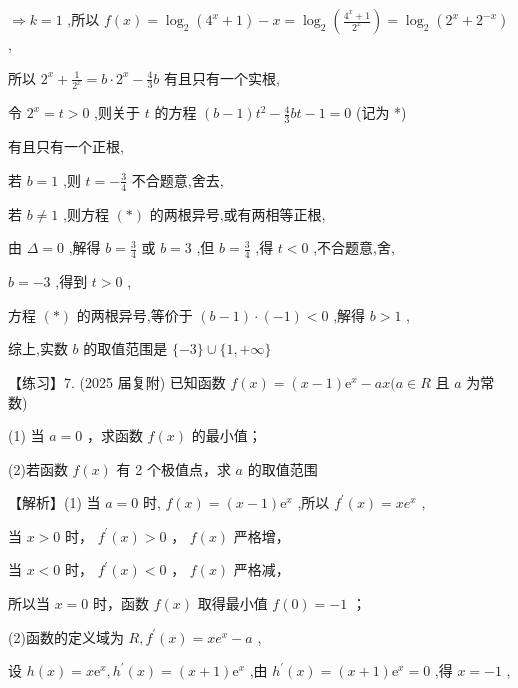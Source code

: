 \documentclass[10pt]{article}
\begin{document}
\(\Rightarrow  k = 1\) ,所以 \(f\left( x\right)  = {\log }_{2}\left( {{4}^{x} + 1}\right)  - x = {\log }_{2}\left( \frac{{4}^{x} + 1}{{2}^{x}}\right)  = {\log }_{2}\left( {{2}^{x} + {2}^{-x}}\right)\) ,

所以 \({2}^{x} + \frac{1}{{2}^{x}} = b \cdot  {2}^{x} - \frac{4}{3}b\) 有且只有一个实根,

令 \({2}^{x} = t > 0\) ,则关于 \(t\) 的方程 \(\left( {b - 1}\right) {t}^{2} - \frac{4}{3}{bt} - 1 = 0\) (记为 *)

有且只有一个正根,

若 \(b = 1\) ,则 \(t =  - \frac{3}{4}\) 不合题意,舍去,

若 \(b \neq  1\) ,则方程 \(\left( *\right)\) 的两根异号,或有两相等正根,

由 \(\Delta  = 0\) ,解得 \(b = \frac{3}{4}\) 或 \(b = 3\) ,但 \(b = \frac{3}{4}\) ,得 \(t < 0\) ,不合题意,舍,

\(b =  - 3\) ,得到 \(t > 0\) ,

方程 \(\left( *\right)\) 的两根异号,等价于 \(\left( {b - 1}\right)  \cdot  \left( {-1}\right)  < 0\) ,解得 \(b > 1\) ,

综上,实数 \(b\) 的取值范围是 \(\{  - 3\}  \cup  \{ 1, + \infty \}\)

【练习】7. (2025 届复附) 已知函数 \(f\left( x\right)  = \left( {x - 1}\right) {\mathrm{e}}^{x} - {ax}(a \in  R\) 且 \(a\) 为常数)

(1) 当 \(a = 0\) ，求函数 \(f\left( x\right)\) 的最小值；

(2)若函数 \(f\left( x\right)\) 有 2 个极值点，求 \(a\) 的取值范围

【解析】(1) 当 \(a = 0\) 时, \(f\left( x\right)  = \left( {x - 1}\right) {\mathrm{e}}^{x}\) ,所以 \({f}^{\prime }\left( x\right)  = x{e}^{x}\) ,

当 \(x > 0\) 时， \({f}^{\prime }\left( x\right)  > 0\) ， \(f\left( x\right)\) 严格增，

当 \(x < 0\) 时， \({f}^{\prime }\left( x\right)  < 0\) ， \(f\left( x\right)\) 严格减，

所以当 \(x = 0\) 时，函数 \(f\left( x\right)\) 取得最小值 \(f\left( 0\right)  =  - 1\) ；

(2)函数的定义域为 \(R,{f}^{\prime }\left( x\right)  = x{e}^{x} - a\) ,

设 \(h\left( x\right)  = x{\mathrm{e}}^{x},{h}^{\prime }\left( x\right)  = \left( {x + 1}\right) {\mathrm{e}}^{x}\) ,由 \({h}^{\prime }\left( x\right)  = \left( {x + 1}\right) {\mathrm{e}}^{x} = 0\) ,得 \(x =  - 1\) ,
\end{document}
